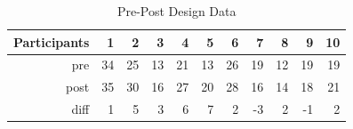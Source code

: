 \begin{table}[ht]
	\centering
	\caption{Pre-Post Design Data}
	\begin{tabular}{rrrrrrrrrrr}
		\hline
		Participants & 1  & 2  & 3  & 4  & 5  & 6  & 7  & 8  & 9  & 10 \\
		\hline
		pre          & 34 & 25 & 13 & 21 & 13 & 26 & 19 & 12 & 19 & 19 \\
		post         & 35 & 30 & 16 & 27 & 20 & 28 & 16 & 14 & 18 & 21 \\ \hline
		diff         & 1  & 5  & 3  & 6  & 7  & 2  & -3 & 2  & -1 & 2  \\
		\hline
	\end{tabular}
	\label{tbl19::01}
\end{table}
